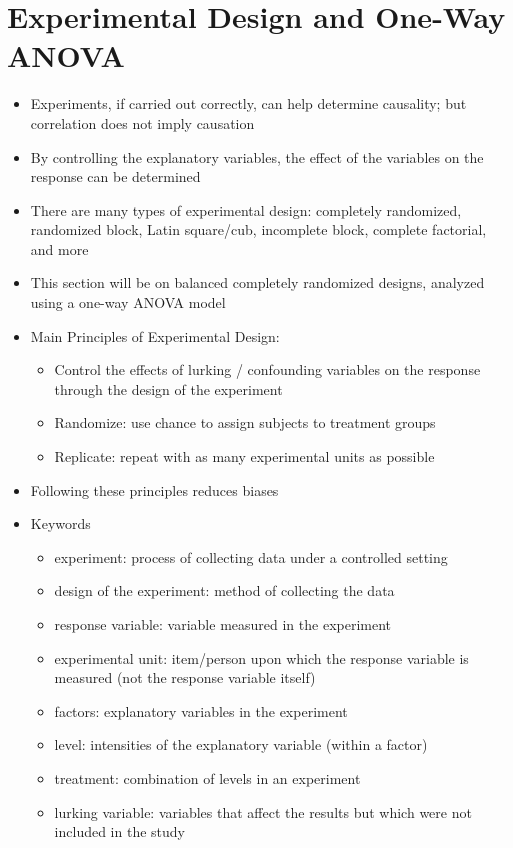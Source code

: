 \documentclass[12pt]{article}
\begin{document}
\section{Experimental Design and One-Way ANOVA}
\begin{itemize}
\item Experiments, if carried out correctly, can help determine causality; but correlation does not imply causation 
\item By controlling the explanatory variables, the effect of the variables on the response can be determined 
\item There are many types of experimental design: completely randomized, randomized block, Latin square/cub, incomplete block, complete factorial, and more 
\item This section will be on balanced completely randomized designs, analyzed using a one-way ANOVA model 
\item Main Principles of Experimental Design: \begin{itemize} 
\item Control the effects of lurking / confounding variables on the response through the design of the experiment 
\item Randomize: use chance to assign subjects to treatment groups 
\item Replicate: repeat with as many experimental units as possible \end{itemize} 
\item Following these principles reduces biases
\item Keywords \begin{itemize} 
\item experiment: process of collecting data under a controlled setting 
\item design of the experiment: method of collecting the data 
\item response variable: variable measured in the experiment 
\item experimental unit: item/person upon which the response variable is measured (not the response variable itself)
\item factors: explanatory variables in the experiment 
\item level: intensities of the explanatory variable (within a factor) 
\item treatment: combination of levels in an experiment 
\item lurking variable: variables that affect the results but which were not included in the study \end{itemize} 

\end{itemize}
\end{document}
